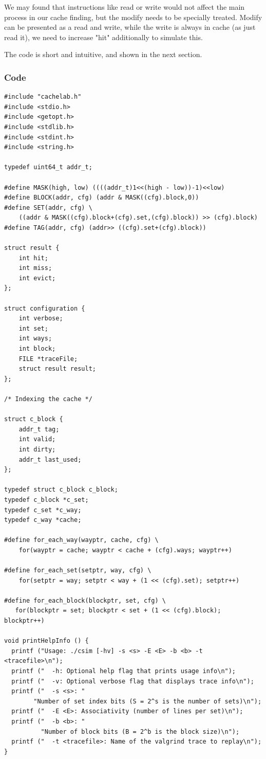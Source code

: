 \documentclass{article}
\begin{document}
We may found that instructions like read or write would not affect the main process in our cache finding, but the modify needs to be specially treated. Modify can be presented as a read and write, while the write is always in cache (as just read it), we need to increase "hit" additionally to simulate this.

The code is short and intuitive, and shown in the next section.

\subsubsection{Code}
\begin{lstlisting}
#include "cachelab.h"
#include <stdio.h>
#include <getopt.h>
#include <stdlib.h>
#include <stdint.h>
#include <string.h>

typedef uint64_t addr_t;

#define MASK(high, low) ((((addr_t)1<<(high - low))-1)<<low)
#define BLOCK(addr, cfg) (addr & MASK((cfg).block,0))
#define SET(addr, cfg) \
    ((addr & MASK((cfg).block+(cfg).set,(cfg).block)) >> (cfg).block)
#define TAG(addr, cfg) (addr>> ((cfg).set+(cfg).block))

struct result {
    int hit;
    int miss;
    int evict;
};

struct configuration {
    int verbose;
    int set;
    int ways;
    int block;
    FILE *traceFile;
    struct result result;
};

/* Indexing the cache */

struct c_block {
    addr_t tag;
    int valid;
    int dirty;
    addr_t last_used;
};

typedef struct c_block c_block;
typedef c_block *c_set;
typedef c_set *c_way;
typedef c_way *cache;

#define for_each_way(wayptr, cache, cfg) \
    for(wayptr = cache; wayptr < cache + (cfg).ways; wayptr++)

#define for_each_set(setptr, way, cfg) \
    for(setptr = way; setptr < way + (1 << (cfg).set); setptr++)

#define for_each_block(blockptr, set, cfg) \
   for(blockptr = set; blockptr < set + (1 << (cfg).block); blockptr++)

void printHelpInfo () {
  printf ("Usage: ./csim [-hv] -s <s> -E <E> -b <b> -t <tracefile>\n");
  printf ("  -h: Optional help flag that prints usage info\n");
  printf ("  -v: Optional verbose flag that displays trace info\n");
  printf ("  -s <s>: "
        "Number of set index bits (S = 2^s is the number of sets)\n");
  printf ("  -E <E>: Associativity (number of lines per set)\n");
  printf ("  -b <b>: "
          "Number of block bits (B = 2^b is the block size)\n");
  printf ("  -t <tracefile>: Name of the valgrind trace to replay\n");
}


\end{lstlisting}
\end{document}
